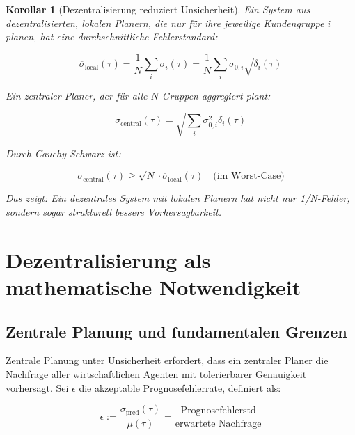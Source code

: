 \documentclass[a4paper, 12pt, twoside, openright]{report}
\newtheorem{corollary}[theorem]{Korollar}
\theoremstyle{definition}
\theoremstyle{definition}
\begin{document}
\begin{corollary}[Dezentralisierung reduziert Unsicherheit]
Ein System aus dezentralisierten, lokalen Planern, die nur für ihre jeweilige Kundengruppe $i$ planen, hat eine durchschnittliche Fehlerstandard:

\begin{equation}
\overline{\sigma}_{\text{local}}(\tau) = \frac{1}{N} \sum_i \sigma_i(\tau) = \frac{1}{N} \sum_i \sigma_{0,i} \sqrt{\delta_i(\tau)}
\end{equation}

Ein zentraler Planer, der für alle $N$ Gruppen aggregiert plant:

\begin{equation}
\sigma_{\text{central}}(\tau) = \sqrt{\sum_i \sigma_{0,i}^2 \delta_i(\tau)}
\end{equation}

Durch Cauchy-Schwarz ist:

\begin{equation}
\sigma_{\text{central}}(\tau) \geq \sqrt{N} \cdot \overline{\sigma}_{\text{local}}(\tau) \quad \text{(im Worst-Case)}
\end{equation}

Das zeigt: Ein dezentrales System mit lokalen Planern hat nicht nur 1/N-Fehler, sondern sogar strukturell bessere Vorhersagbarkeit.
\end{corollary}

\section{Dezentralisierung als mathematische Notwendigkeit}
\label{sec:dezentralisierung}

\subsection{Zentrale Planung und fundamentalen Grenzen}

Zentrale Planung unter Unsicherheit erfordert, dass ein zentraler Planer die Nachfrage aller wirtschaftlichen Agenten mit tolerierbarer Genauigkeit vorhersagt. Sei $\epsilon$ die akzeptable Prognosefehlerrate, definiert als:

\begin{equation}
\epsilon := \frac{\sigma_{\text{pred}}(\tau)}{\mu(\tau)} = \frac{\text{Prognosefehlerstd}}{\text{erwartete Nachfrage}}
\label{eq:error_rate}
\end{equation}
\end{document}

